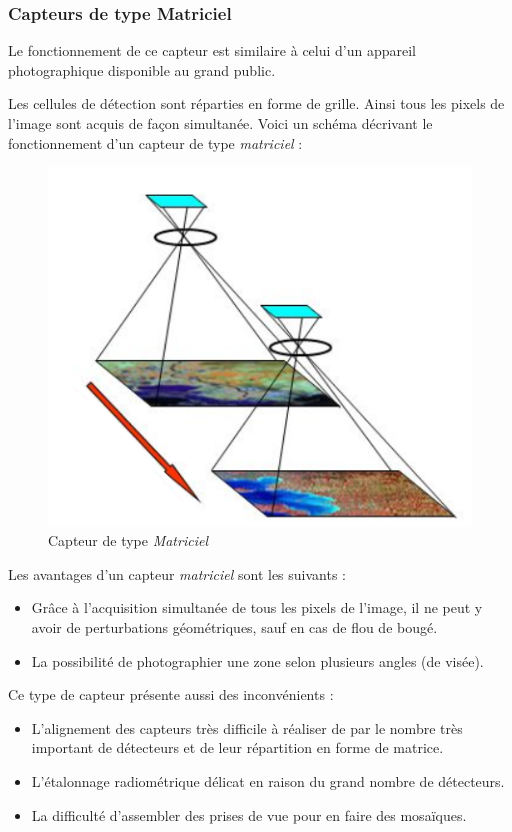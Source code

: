 \documentclass[a4paper, 11pt]{report}
\begin{document}
\subsubsection{Capteurs de type Matriciel}
Le fonctionnement de ce capteur est similaire à celui d'un appareil photographique disponible au grand public.

Les cellules de détection sont réparties en forme de grille. Ainsi tous les pixels de l'image sont acquis de façon simultanée.
Voici un schéma décrivant le fonctionnement d'un capteur de type \emph{matriciel} :
\begin{figure}[H]
	\begin{center}
		\includegraphics[scale=0.7]{Images/CCD_Sensor.png}
		\caption{Capteur de type \emph{Matriciel}}
	\end{center}
\end{figure}

Les avantages d'un capteur \emph{matriciel} sont les suivants :
\begin{itemize}
	\item Grâce à l'acquisition simultanée de tous les pixels de l'image, il ne peut y avoir de perturbations géométriques, sauf en cas de flou de bougé.
	\item La possibilité de photographier une zone selon plusieurs angles (de visée).
\end{itemize}
Ce type de capteur présente aussi des inconvénients :
\begin{itemize}
	\item L'alignement des capteurs très difficile à réaliser de par le nombre très important de détecteurs et de leur répartition en forme de matrice.
	\item L'étalonnage radiométrique délicat en raison du grand nombre de détecteurs.
	\item La difficulté d'assembler des prises de vue pour en faire des mosaïques.
\end{itemize}
\end{document}
